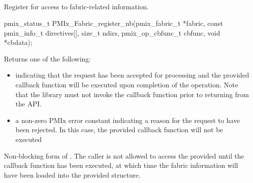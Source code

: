 \subsection{}

\summary

Register for access to fabric-related information.

\format

\cspecificstart
\begin{codepar}
pmix_status_t
PMIx_Fabric_register_nb(pmix_fabric_t *fabric,
                        const pmix_info_t directives[],
                        size_t ndirs,
                        pmix_op_cbfunc_t cbfunc, void *cbdata);
\end{codepar}
\cspecificend

\begin{arglist}
\end{arglist}

Returns one of the following:

\begin{itemize}
\item {} indicating that the request has been accepted for processing and the provided callback function will be executed upon completion of the operation. Note that the library must not invoke the callback function prior to returning from the \ac{API}.
\item a non-zero \ac{PMIx} error constant indicating a reason for the request to have been rejected. In this case, the provided callback function will not be executed
\end{itemize}


\descr

Non-blocking form of . The caller is not allowed to access the provided  until the callback function has been executed, at which time the fabric information will have been loaded into the provided structure.

